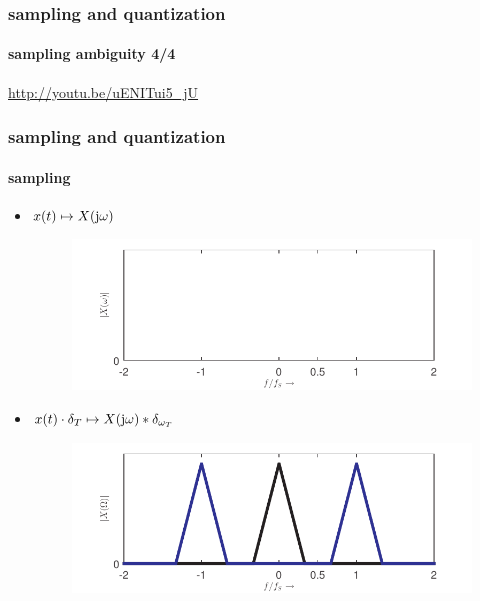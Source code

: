 	\begin{frame}\frametitle{sampling and quantization}\framesubtitle{sampling ambiguity 4/4}
        \url{http://youtu.be/uENITui5_jU}
	\end{frame}	
	\begin{frame}\frametitle{sampling and quantization}\framesubtitle{sampling}
		\begin{itemize}
			\item[]	$x(t) \mapsto X(\mathrm{j}\omega)$
				\vspace{-6mm}
				\begin{figure}
					\flushright
						\includegraphics[scale=.4]{Graph/spectrum_sampling_1}
				\end{figure}
			
			\pause
			\item[]	$x(t)\cdot \delta_T \mapsto X(\mathrm{j}\omega)\ast \delta_{\omega_T}$
				\vspace{-6mm}
				\begin{figure}
					\flushright
						\includegraphics[scale=.4]{Graph/spectrum_sampling_2}
				\end{figure}
		\end{itemize}		
			\pause
        \begin{center}
        \end{center}
	\end{frame}
	
